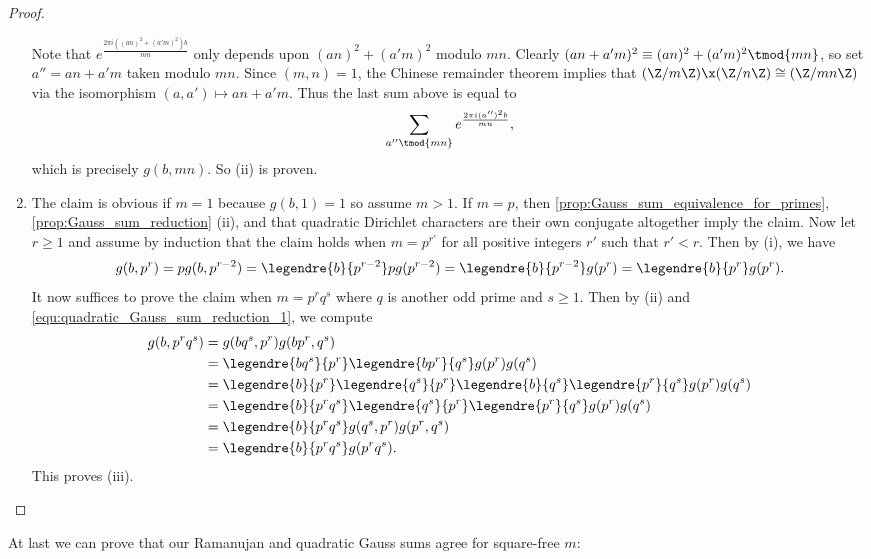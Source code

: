 \begin{proof}
\begin{enumerate}[label=(\roman*)]
\[            \]
            Note that $e^{\frac{2\pi i\left((an)^{2}+(a'm)^{2}\right)b}{mn}}$ only depends upon $(an)^{2}+(a'm)^{2}$ modulo $mn$. Clearly $(an+a'm)^{2} \equiv (an)^{2}+(a'm)^{2} \tmod{mn}$, so set $a'' = an+a'm$ taken modulo $mn$. Since $(m,n) = 1$, the Chinese remainder theorem implies that $(\Z/m\Z) \x (\Z/n\Z) \cong (\Z/mn\Z)$ via the isomorphism $(a,a') \mapsto an+a'm$. Thus the last sum above is equal to
            \[
              \sum_{a'' \tmod{mn}}e^{\frac{2\pi i(a'')^{2}b}{mn}},
            \]
            which is precisely $g(b,mn)$. So (ii) is proven.
          \item The claim is obvious if $m = 1$ because $g(b,1) = 1$ so assume $m > 1$. If $m = p$, then \cref{prop:Gauss_sum_equivalence_for_primes}, \cref{prop:Gauss_sum_reduction} (ii), and that quadratic Dirichlet characters are their own conjugate altogether imply the claim. Now let $r \ge 1$ and assume by induction that the claim holds when $m = p^{r'}$ for all positive integers $r'$ such that $r' < r$. Then by (i), we have
          \begin{equation}\label{equ:quadratic_Gauss_sum_reduction_1}
            g(b,p^{r}) = pg(b,p^{r-2}) = \legendre{b}{p^{r-2}}pg(p^{r-2}) = \legendre{b}{p^{r-2}}g(p^{r}) = \legendre{b}{p^{r}}g(p^{r}).
          \end{equation}
          It now suffices to prove the claim when $m = p^{r}q^{s}$ where $q$ is another odd prime and $s \ge 1$. Then by (ii) and \cref{equ:quadratic_Gauss_sum_reduction_1}, we compute
          \begin{align*}
            g(b,p^{r}q^{s}) &= g(bq^{s},p^{r})g(bp^{r},q^{s}) \\
            &= \legendre{bq^{s}}{p^{r}}\legendre{bp^{r}}{q^{s}}g(p^{r})g(q^{s}) \\
            &= \legendre{b}{p^{r}}\legendre{q^{s}}{p^{r}}\legendre{b}{q^{s}}\legendre{p^{r}}{q^{s}}g(p^{r})g(q^{s}) \\
            &= \legendre{b}{p^{r}q^{s}}\legendre{q^{s}}{p^{r}}\legendre{p^{r}}{q^{s}}g(p^{r})g(q^{s}) \\
            &= \legendre{b}{p^{r}q^{s}}g(q^{s},p^{r})g(p^{r},q^{s}) \\
            &= \legendre{b}{p^{r}q^{s}}g(p^{r}q^{s}).
          \end{align*}
          This proves (iii).
        \end{enumerate}
      \end{proof}

      At last we can prove that our Ramanujan and quadratic Gauss sums agree for square-free $m$:

